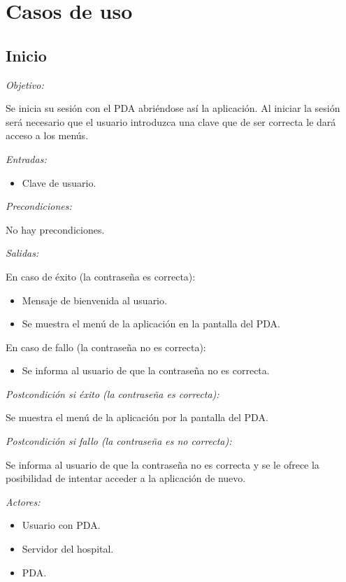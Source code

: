 \documentclass[12pt,a4paper,notitlepage,twoside]{report}
\begin{document}
\section{Casos de uso}
\subsection{Inicio}
\emph{Objetivo:}
\begin{description}
Se inicia su sesi\'on con el PDA abri\'endose as\'i la aplicaci\'on. Al iniciar la sesi\'on ser\'a necesario que el usuario introduzca una clave que de ser correcta le dar\'a acceso a los men\'us.
\end{description}
\emph{Entradas:} 
\begin{itemize}
\item Clave de usuario.
\end{itemize}
\emph{Precondiciones:}
\begin{description}
No hay precondiciones.
\end{description}
\emph{Salidas:}
\begin{description}
\item En caso de \'exito (la contrase\~na es correcta): 
\begin{itemize}
\item Mensaje de bienvenida al usuario. 
\item Se muestra el men\'u de la aplicaci\'on en la pantalla del PDA.
\end{itemize}
\item En caso de fallo (la contrase\~na no es correcta): 
\begin{itemize}
\item Se informa al usuario de que la contrase\~na no es correcta.
\end{itemize}
\end{description}
\emph{Postcondici\'on si \'exito (la contrase\~na es correcta):}
\begin{description}
Se muestra el men\'u de la aplicaci\'on por la pantalla del PDA.
\end{description}
\emph{Postcondici\'on si fallo (la contrase\~na es no correcta):}
\begin{description}
Se informa al usuario de que la contrase\~na no es correcta y se le ofrece la posibilidad de intentar acceder a la aplicaci\'on de nuevo.
\end{description}
\emph{Actores: }
\begin{itemize}
\item Usuario con PDA.
\item Servidor del hospital.
\item PDA.
\end{itemize}
\end{document}
